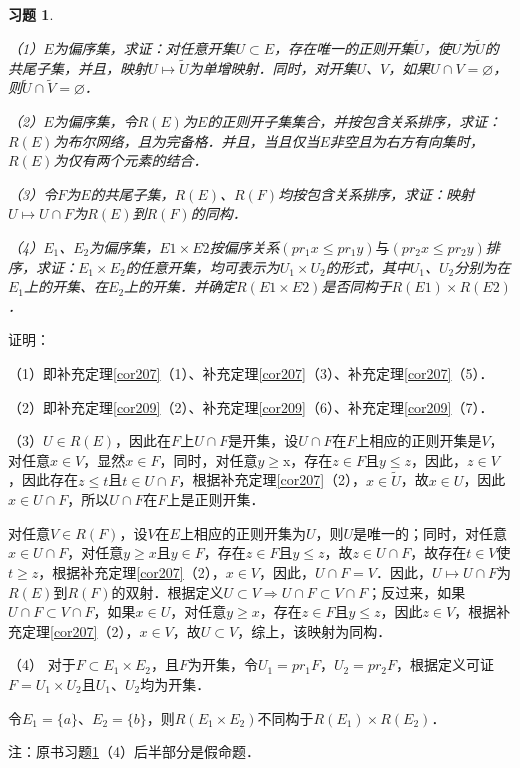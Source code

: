 \documentclass[12pt, a4paper, oneside]{book}
\newtheorem{exer}{习题}
\begin{document}
			\begin{exer}\label{exer98}
				\hfill\par
				（1）$E$为偏序集，求证：对任意开集$U\subset E$，存在唯一的正则开集$\tilde{U}$，使$U$为$\tilde{U}$的共尾子集，并且，映射$U\mapsto \tilde{U}$为单增映射．同时，对开集$U$、$V$，如果$U\cap V=\varnothing$，则$\tilde{U}\cap \tilde{V}=\varnothing$．
				\par
				（2）$E$为偏序集，令$R(E)$为$E$的正则开子集集合，并按包含关系排序，求证：$R(E)$为布尔网络，且为完备格．并且，当且仅当$E$非空且为右方有向集时，$R(E)$为仅有两个元素的结合．
				\par
				（3）令$F$为$E$的共尾子集，$R(E)$、$R(F)$均按包含关系排序，求证：映射$U\mapsto U\cap F$为$R(E)$到$R(F)$的同构．
				\par
				（4）$E_1$、$E_2$为偏序集，$E1\times E2$按偏序关系$(pr_1x\leq pr_1y)\text{与}(pr_2x\leq pr_2y)$排序，求证：$E_1\times E_2$的任意开集，均可表示为$U_1\times U_2$的形式，其中$U_1$、$U_2$分别为在$E_1$上的开集、在$E_2$上的开集．并确定$R(E1\times E2)$是否同构于$R(E1)\times R(E2)$．
			\end{exer}
			证明：
			\par
			（1）即补充定理\ref{cor207}（1）、补充定理\ref{cor207}（3）、补充定理\ref{cor207}（5）．
			\par
			（2）即补充定理\ref{cor209}（2）、补充定理\ref{cor209}（6）、补充定理\ref{cor209}（7）．
			\par
			（3）$U\in R(E)$，因此在$F$上$U\cap F$是开集，设$U\cap F$在$F$上相应的正则开集是$V$，对任意$x\in V$，显然$x\in F$，同时，对任意$y\geq $x，存在$z\in F$且$y\leq z$，因此，$z\in V$，因此存在$z\leq t$且$t\in U\cap F$，根据补充定理\ref{cor207}（2），$x\in \tilde{U}$，故$x\in U$，因此$x\in U\cap F$，所以$U\cap F$在$F$上是正则开集．
			\par
			对任意$V\in R(F)$，设$V$在$E$上相应的正则开集为$U$，则$U$是唯一的；同时，对任意$x\in U\cap F$，对任意$y\geq x$且$y\in F$，存在$z\in F$且$y\leq z$，故$z\in U\cap F$，故存在$t\in V$使$t\geq z$，根据补充定理\ref{cor207}（2），$x\in V$，因此，$U\cap F=V$．因此，$U\mapsto U\cap F$为$R(E)$到$R(F)$的双射．根据定义$U\subset V\Rightarrow U\cap F\subset V\cap F$；反过来，如果$U\cap F\subset V\cap F$，如果$x\in U$，对任意$y\geq x$，存在$z\in F$且$y\leq z$，因此$z\in V$，根据补充定理\ref{cor207}（2），$x\in V$，故$U\subset V$，综上，该映射为同构．
			\par
			（4）	对于$F\subset E_1\times E_2$，且$F$为开集，令$U_1=pr_1F$，$U_2=pr_2F$，根据定义可证$F=U_1\times U_2$且$U_1$、$U_2$均为开集．
			\par
			令$E_1=\{a\}$、$E_2=\{b\}$，则$R(E_1\times E_2)$不同构于$R(E_1)\times R(E_2)$．
			\par
			注：原书习题\ref{exer98}（4）后半部分是假命题．
			
\end{document}
